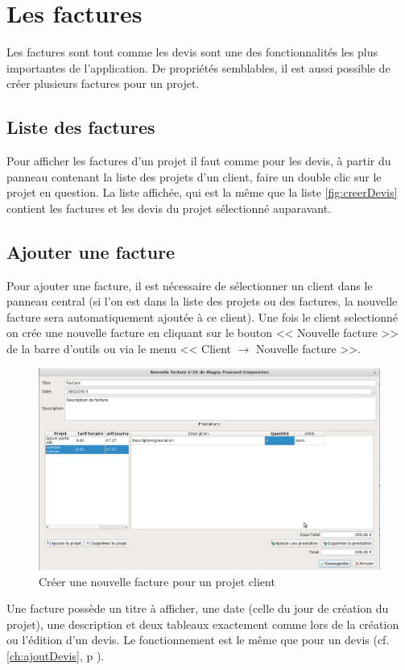 \chapter{Les factures}
Les factures sont tout comme les devis sont une des fonctionnalités les plus importantes de l'application. De propriétés semblables, il est aussi possible de créer plusieurs factures pour un projet.
\section{Liste des factures}
Pour afficher les factures d'un projet il faut comme pour les devis, à partir du panneau contenant la liste des projets d'un client, faire un double clic sur le projet en question. La liste affichée, qui est la même que la liste \ref{fig:creerDevis} contient les factures et les devis du projet sélectionné auparavant.

\section{Ajouter une facture}
Pour ajouter une facture, il est nécessaire de sélectionner un client dans le panneau central (si l'on est dans la liste des projets ou des factures, la nouvelle facture sera automatiquement ajoutée à ce client). Une fois le client selectionné on crée une nouvelle facture en cliquant sur le bouton << Nouvelle facture >> de la barre d'outils ou via le menu << Client $\rightarrow$ Nouvelle facture >>. 
\begin{figure}[H]
	\centering
	\includegraphics[width=17cm]{screens/creerFacture.png}
	\caption{Créer une nouvelle facture pour un projet client}
	\label{fig:creerFacture}
\end{figure}
Une facture possède un titre à afficher, une date (celle du jour de création du projet), une description et deux tableaux exactement comme lors de la création ou l'édition d'un devis. Le fonctionnement est le même que pour un devis (cf. \ref*{ch:ajoutDevis}, p \pageref{ch:Prestations}).

